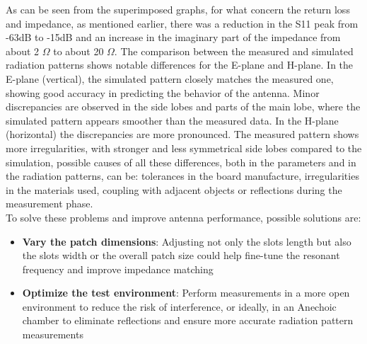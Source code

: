 \documentclass[]{article}
\begin{document}
As can be seen from the superimposed graphs, for what concern the return loss and impedance, as mentioned earlier, there was a reduction in the S11 peak from -63dB to -15dB and an increase in the imaginary part of the impedance from about 2 $\Omega$ to about 20 $\Omega$.
The comparison between the measured and simulated radiation patterns shows notable differences for the E-plane and H-plane. In the E-plane (vertical), the simulated pattern closely matches the measured one, showing good accuracy in predicting the behavior of the antenna. Minor discrepancies are observed in the side lobes and parts of the main lobe, where the simulated pattern appears smoother than the measured data.
In the H-plane (horizontal) the discrepancies are more pronounced. The measured pattern shows more irregularities, with stronger and less symmetrical side lobes compared to the simulation, possible causes of all these differences, both in the parameters and in the radiation patterns, can be: tolerances in the board manufacture, irregularities in the materials used, coupling with adjacent objects or reflections during the measurement phase.\\
To solve these problems and improve antenna performance, possible solutions are: 
\begin{itemize}
	\item \textbf{Vary the patch dimensions}: Adjusting not only the slots length but also the slots width or the overall patch size could help fine-tune the resonant frequency and improve impedance matching
	\item \textbf{Optimize the test environment}: Perform measurements in a more open environment to reduce the risk of interference, or ideally, in an Anechoic chamber to eliminate reflections and ensure more accurate radiation pattern measurements
\end{itemize}
\end{document}
